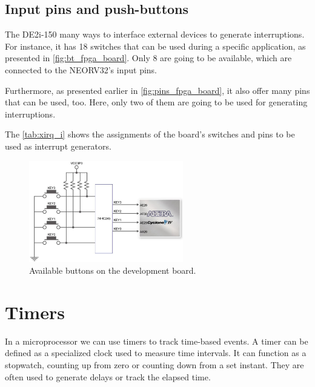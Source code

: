         \subsection{Input pins and push-buttons}
            The DE2i-150 many ways to interface external devices to generate interruptions. For instance, it has 18 switches that can be used during a specific application, as presented in \autoref{fig:bt_fpga_board}. Only 8 are going to be available, which are connected to the NEORV32's input pins. 

            Furthermore, as presented earlier in \autoref{fig:pins_fpga_board}, it also offer many pins that can be used, too. Here, only two of them are going to be used for generating interruptions.
            
            The \autoref{tab:xirq_i} shows the assignments of the board's switches and pins to be used as interrupt generators.
            
            \begin{figure}[!ht]
                \begin{center}
                    \includegraphics[width= 0.6\textwidth]{figures/bt_fpga_board.png}
                    \caption{\label{fig:bt_fpga_board} Available buttons on the development board.}
                \end{center}
            \end{figure}

    \section{Timers}\label{sec:section_p.3}

        In a microprocessor we can use timers to track time-based events. A timer can be defined as a specialized clock used to measure time intervals. It can function as a stopwatch, counting up from zero or counting down from a set instant. They are often used to generate delays or track the elapsed time. 

